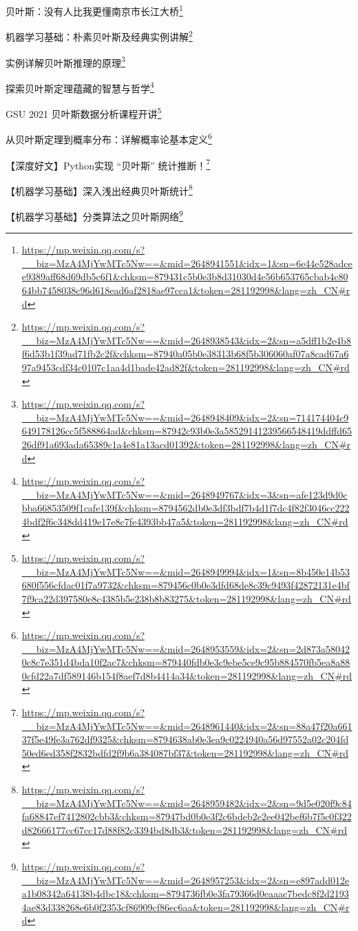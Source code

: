 \documentclass[]{ctexbook}
\renewcommand{\href}[2]{#2\footnote{\url{#1}}}
\begin{document}
\href{https://mp.weixin.qq.com/s?__biz=MzA4MjYwMTc5Nw==\&mid=2648941551\&idx=1\&sn=6e44e528adcee9389aff68d69db5c6f1\&chksm=879431c5b0e3b8d31030d4e56b653765cbab4c8064bb7458038c96d618ead6af2818ae97cca1\&token=281192998\&lang=zh_CN\#rd}{贝叶斯：没有人比我更懂南京市长江大桥}

\href{https://mp.weixin.qq.com/s?__biz=MzA4MjYwMTc5Nw==\&mid=2648938543\&idx=2\&sn=a5dff1b2e4b8f6d53b1f39ad71fb2c2f\&chksm=87940a05b0e38313b68f5b306060af07a8cad67a697a9453cdf34c0107c1aa4d1bade42ad82f\&token=281192998\&lang=zh_CN\#rd}{机器学习基础：朴素贝叶斯及经典实例讲解}

\href{https://mp.weixin.qq.com/s?__biz=MzA4MjYwMTc5Nw==\&mid=2648948409\&idx=2\&sn=714174404c9649178126cc5f588864ad\&chksm=87942c93b0e3a58529141239566548419ddffd6526df91a693ada65389c1a4e81a13acd01392\&token=281192998\&lang=zh_CN\#rd}{实例详解贝叶斯推理的原理}

\href{https://mp.weixin.qq.com/s?__biz=MzA4MjYwMTc5Nw==\&mid=2648949767\&idx=3\&sn=afe123d9d0cbba66853509f1cafe139f\&chksm=8794562db0e3df3bdf7b4d1f7dc4f82f3046cc2224bdf2f6c348dd419e17e8c7fe4393bb47a5\&token=281192998\&lang=zh_CN\#rd}{探索贝叶斯定理蕴藏的智慧与哲学}

\href{https://mp.weixin.qq.com/s?__biz=MzA4MjYwMTc5Nw==\&mid=2648949994\&idx=1\&sn=8b450e14b53680f556cfdac01f7a9732\&chksm=879456c0b0e3dfd68de8c39c9493f42872131e4bf7f9ca22d397580e8c4385b5e238b8b83275\&token=281192998\&lang=zh_CN\#rd}{GSU 2021 \textbar{} 贝叶斯数据分析课程开讲}

\href{https://mp.weixin.qq.com/s?__biz=MzA4MjYwMTc5Nw==\&mid=2648953559\&idx=2\&sn=2d873a580420c8c7e351d4bda10f2ac7\&chksm=879440fdb0e3c9ebe5ce9c95b884570fb5ea8a880cfd22a7df589146b154f8aef7d8b4414a34\&token=281192998\&lang=zh_CN\#rd}{从贝叶斯定理到概率分布：详解概率论基本定义}

\href{https://mp.weixin.qq.com/s?__biz=MzA4MjYwMTc5Nw==\&mid=2648961440\&idx=2\&sn=88a47f20a66137f5e49fe3a762df9325\&chksm=8794638ab0e3ea9c0224940a56d97552a02c204fd50ed6ed358f2832bdfd2f9b6a384087bf37\&token=281192998\&lang=zh_CN\#rd}{【深度好文】Python实现 ``贝叶斯'' 统计推断！}

\href{https://mp.weixin.qq.com/s?__biz=MzA4MjYwMTc5Nw==\&mid=2648959482\&idx=2\&sn=9d5e020f9c84fa68847ef7412802cbb3\&chksm=87947bd0b0e3f2c6bdeb2e2ee042bef6b7f5c0f322d82666177cc67cc17d88f82c3394bd8db3\&token=281192998\&lang=zh_CN\#rd}{【机器学习基础】深入浅出经典贝叶斯统计}

\href{https://mp.weixin.qq.com/s?__biz=MzA4MjYwMTc5Nw==\&mid=2648957253\&idx=2\&sn=e897add012ea1b08342a64138b4dbc18\&chksm=8794736fb0e3fa79366d0eaaac7bedc8f2d21934ae83d338268e6b0f2353cf86909cf86ec6aa\&token=281192998\&lang=zh_CN\#rd}{【机器学习基础】分类算法之贝叶斯网络}
\end{document}
